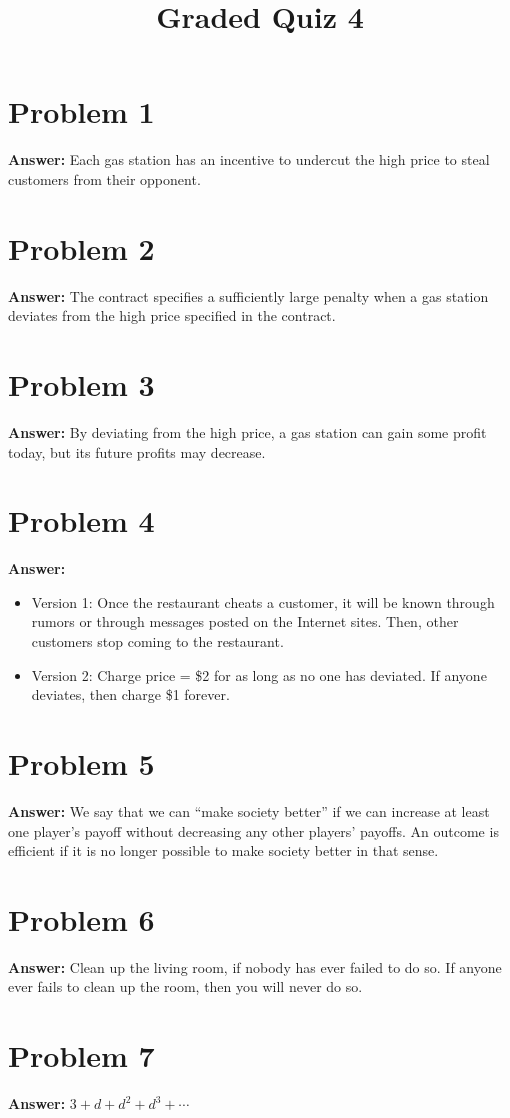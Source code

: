\documentclass[11pt]{article}
\date{}
\title{Graded Quiz 4}
\begin{document}
\thispagestyle{empty}
\pagestyle{empty}
\section*{Problem 1}
\label{sec:orgc9e45fd}

\textbf{Answer:} Each gas station has an incentive to undercut the high price to steal
customers from their opponent.
\section*{Problem 2}
\label{sec:org6330832}

\textbf{Answer:} The contract specifies a sufficiently large penalty when a gas station
deviates from the high price specified in the contract.
\section*{Problem 3}
\label{sec:orgd28d2b1}

\textbf{Answer:} By deviating from the high price, a gas station can gain some profit
today, but its future profits may decrease.
\section*{Problem 4}
\label{sec:org662b3ba}

\textbf{Answer:}
\begin{itemize}
\item Version 1: Once the restaurant cheats a customer, it will be known through
rumors or through messages posted on the Internet sites. Then, other customers
stop coming to the restaurant.
\item Version 2: Charge price = \$2 for as long as no one has deviated. If anyone
deviates, then charge \$1 forever.
\end{itemize}
\section*{Problem 5}
\label{sec:org554e8e4}

\textbf{Answer:} We say that we can ``make society better'' if we can increase at least
one player's payoff without decreasing any other players' payoffs. An outcome is
efficient if it is no longer possible to make society better in that sense.
\section*{Problem 6}
\label{sec:org1d532c7}

\textbf{Answer:} Clean up the living room, if nobody has ever failed to do so. If
anyone ever fails to clean up the room, then you will never do so.
\section*{Problem 7}
\label{sec:orgeef1d5a}

\textbf{Answer:} \(3+d+d^2+d^3+\cdots\)
\end{document}
